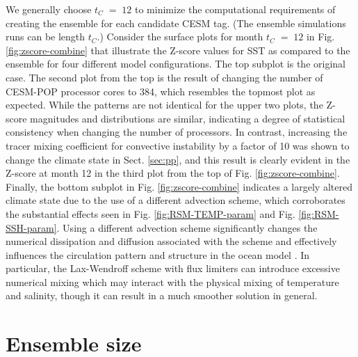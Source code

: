 \documentclass[gmd, manuscript]{copernicus}
\begin{document}
 We generally choose $t_C \;=\; 12$ to minimize the computational requirements of creating the ensemble for each candidate CESM tag. (The ensemble simulations runs can be length $t_C$.)  Consider the surface plots for month $t_C \;=\; 12$ in Fig. \ref{fig:zscore-combine} that illustrate the Z-score values for SST as compared to the ensemble for four different model configurations.  The top subplot is the original case.  The second plot from the top is the result of changing the number of CESM-POP processor cores to 384, which resembles the topmost plot as expected.  While the patterns are not identical for the upper two plots, the Z-score magnitudes and distributions are similar, indicating a degree of statistical consistency when changing the number of processors.  In contrast, increasing the tracer mixing coefficient for convective instability by a factor of 10 was shown to change the climate state in Sect. \ref{sec:pp}, and this result is clearly evident in the Z-score at month 12 in the third plot from the top of Fig. \ref{fig:zscore-combine}.  Finally, the bottom subplot in Fig. \ref{fig:zscore-combine} indicates a largely altered climate state due to the use of a different advection scheme, which corroborates the substantial effects seen in Fig. \ref{fig:RSM-TEMP-param} and Fig. \ref{fig:RSM-SSH-param}.  Using a different advection scheme significantly changes the numerical dissipation and diffusion associated with the scheme \citep{tseng2008} and effectively influences the circulation pattern and structure in the ocean model \citep[e.g.,][]{tseng2006}. 
In particular, the Lax-Wendroff scheme with flux limiters can introduce excessive numerical mixing which may interact with the physical mixing of temperature and salinity, though it can result in a much smoother solution in general.


\section{Ensemble size } \label{sec:ens}
\end{document}
